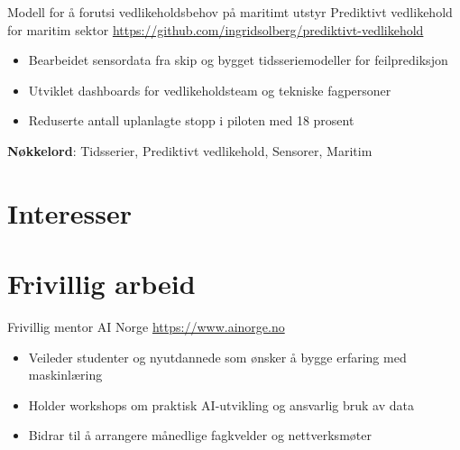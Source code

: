 \documentclass[a4paper, serif, 10pt]{moderncv}
\begin{document}
        {Modell for å forutsi vedlikeholdsbehov på maritimt utstyr}
        {Prediktivt vedlikehold for maritim sektor}
        {\url{https://github.com/ingridsolberg/prediktivt-vedlikehold}}
        {}
        {\begin{itemize}
\item Bearbeidet sensordata fra skip og bygget tidsseriemodeller for feilprediksjon
\item Utviklet dashboards for vedlikeholdsteam og tekniske fagpersoner
\item Reduserte antall uplanlagte stopp i piloten med 18 prosent
\end{itemize}
\textbf{Nøkkelord}: Tidsserier, Prediktivt vedlikehold, Sensorer, Maritim}
\section{Interesser}

\section{Frivillig arbeid}

        {Frivillig mentor}
        {AI Norge}
        {\url{https://www.ainorge.no}}
        {}
        {\begin{itemize}
\item Veileder studenter og nyutdannede som ønsker å bygge erfaring med maskinlæring
\item Holder workshops om praktisk AI-utvikling og ansvarlig bruk av data
\item Bidrar til å arrangere månedlige fagkvelder og nettverksmøter
\end{itemize}}
    
\end{document}
